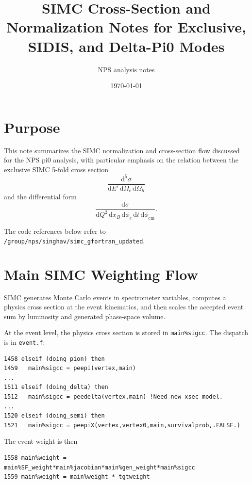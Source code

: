 \documentclass[11pt]{article}
\title{SIMC Cross-Section and Normalization Notes for Exclusive, SIDIS, and Delta-Pi0 Modes}
\author{NPS analysis notes}
\date{\today}
\newcommand{\dd}{\mathrm{d}}
\newcommand{\phicm}{\phi_{\mathrm{cm}}}
\newcommand{\xb}{x_B}
\newcommand{\Qsq}{Q^2}
\newcommand{\Escat}{E'}
\begin{document}
\maketitle

\section{Purpose}

This note summarizes the SIMC normalization and cross-section flow discussed for
the NPS pi0 analysis, with particular emphasis on the relation between the
exclusive SIMC 5-fold cross section
\[
  \frac{\dd^5\sigma}{\dd \Escat\,\dd\Omega_e\,\dd\Omega_h}
\]
and the differential form
\[
  \frac{\dd\sigma}
       {\dd \Qsq\,\dd \xb\,\dd\phi_e\,\dd t\,\dd\phicm}.
\]

The code references below refer to
\texttt{/group/nps/singhav/simc\_gfortran\_updated}.

\section{Main SIMC Weighting Flow}

SIMC generates Monte Carlo events in spectrometer variables, computes a physics
cross section at the event kinematics, and then scales the accepted event sum by
luminosity and generated phase-space volume.

At the event level, the physics cross section is stored in
\texttt{main\%sigcc}.  The dispatch is in \texttt{event.f}:

\begin{lstlisting}
1458 elseif (doing_pion) then
1459   main%sigcc = peepi(vertex,main)
...
1511 elseif (doing_delta) then
1512   main%sigcc = peedelta(vertex,main) !Need new xsec model.
...
1520 elseif (doing_semi) then
1521   main%sigcc = peepiX(vertex,vertex0,main,survivalprob,.FALSE.)
\end{lstlisting}

The event weight is then

\begin{lstlisting}
1558 main%weight = main%SF_weight*main%jacobian*main%gen_weight*main%sigcc
1559 main%weight = main%weight * tgtweight
\end{lstlisting}
\end{document}

